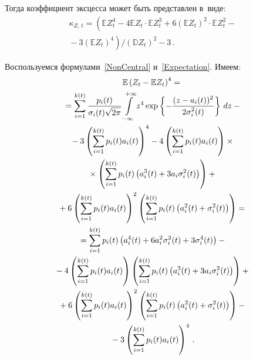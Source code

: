 \begin{multicols}{2}
Тогда коэффициент эксцесса может быть представлен в~виде:
\begin{multline}
\kappa_{Z,\,t}=\left(\mathbb{E} Z_t^4-4\mathbb{E} Z_t\cdot 
\mathbb{E} Z_t^3+6\left(\mathbb{E} Z_t\right)^2\cdot 
\mathbb{E} Z_t^2-{}\right.\\
\left.{}-3\left(\mathbb{E} Z_t\right)^4\right)\Big/
\left(\mathbb{D} Z_t\right)^2-3\,.
\label{Kurt}
\end{multline}

Воспользуемся формулами~\eqref{NonCentral} и~\eqref{Expectation}. Имеем:
\begin{multline*}
\mathbb{E} \left(Z_t-\mathbb{E} Z_t\right)^4={}\\
{}=
\sum\limits_{i=1}^{k(t)} \fr{p_i(t)}{\sigma_i(t)\sqrt{2\pi}} %
\int\limits_{-\infty}^{+\infty} z^4\exp\left\{-\fr{(z-a_i(t))^2}
{2\sigma_i^2(t)}\right\} \,dz-{}\\
{}-
3\left(\sum\limits_{i=1}^{k(t)} p_i(t) a_i(t)\right)^4-
4\left(\sum\limits_{i=1}^{k(t)} p_i(t) a_i(t)\right) \times{}\\
{}\times
\left(\sum\limits_{i=1}^{k(t)} p_i(t)\left(a_i^3(t)+
3a_i\sigma_i^2(t)\right)\right)+{}\\
{}+6\left(\sum\limits_{i=1}^{k(t)} p_i(t) a_i(t)\right)^2\left(
\sum\limits_{i=1}^{k(t)} p_i(t) \left(a_i^2(t) + \sigma_i^2(t)\right)\right)={}\\
{}=\sum\limits_{i=1}^{k(t)} p_i(t)\left(a_i^4(t)+
6a_i^2\sigma_i^2(t)+3\sigma_i^4(t)\right)-{}\\
{}-4\left(\sum\limits_{i=1}^{k(t)} p_i(t) a_i(t)\right) \left(
\sum\limits_{i=1}^{k(t)} p_i(t)\left(a_i^3(t)+3a_i\sigma_i^2(t)\right)\right)+{}\\
{}+6\left(\sum\limits_{i=1}^{k(t)} p_i(t) a_i(t)\right)^2
\left(\sum\limits_{i=1}^{k(t)} p_i(t) \left(a_i^2(t) + \sigma_i^2(t)\right)\right)-{}\\
{}-
3\left(\sum\limits_{i=1}^{k(t)} p_i(t) a_i(t)\right)^4\,.
\end{multline*}


\end{multicols}

